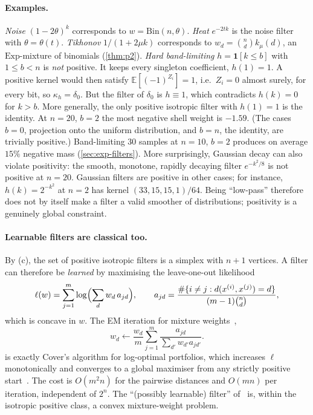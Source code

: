 \documentclass[11pt]{article}
\theoremstyle{definition}
\theoremstyle{remark}
\newcommand{\one}{\mathbf{1}}
\begin{document}
\paragraph{Examples.}
\emph{Noise} $(1-2\theta)^k$ corresponds to $w=\mathrm{Bin}(n,\theta)$. \emph{Heat} $e^{-2tk}$ is the noise filter with $\theta=\theta(t)$. \emph{Tikhonov} $1/(1+2\mu k)$ corresponds to $w_d=\binom nd k_\mu(d)$, an $\mathrm{Exp}$-mixture of binomials (\cref{thm:p2}). \emph{Hard band-limiting} $h=\one[k\le b]$ with $1\le b<n$ is \emph{not} positive. It keeps every singleton coefficient, $h(1)=1$. A positive kernel would then satisfy $\mathbb E[(-1)^{Z_i}]=1$, i.e.\ $Z_i=0$ almost surely, for every bit, so $\kappa_h=\delta_0$. But the filter of $\delta_0$ is $h\equiv1$, which contradicts $h(k)=0$ for $k>b$. More generally, the only positive isotropic filter with $h(1)=1$ is the identity. At $n=20$, $b=2$ the most negative shell weight is $-1.59$. (The cases $b=0$, projection onto the uniform distribution, and $b=n$, the identity, are trivially positive.) Band-limiting $30$ samples at $n=10$, $b=2$ produces on average $15\%$ negative mass (\cref{sec:exp-filters}). More surprisingly, Gaussian decay can also violate positivity: the smooth, monotone, rapidly decaying filter $e^{-k^2/8}$ is not positive at $n=20$. Gaussian filters are positive in other cases; for instance, $h(k)=2^{-k^2}$ at $n=2$ has kernel $(33,15,15,1)/64$. Being ``low-pass'' therefore does not by itself make a filter a valid smoother of distributions; positivity is a genuinely global constraint.

\paragraph{Learnable filters are classical too.}
By (c), the set of positive isotropic filters is a simplex with $n+1$ vertices. A filter can therefore be \emph{learned} by maximising the leave-one-out likelihood
\[
\ell(w)=\sum_{j=1}^m\log\Bigl(\sum_d w_d\,a_{jd}\Bigr),\qquad a_{jd}=\frac{\#\{i\neq j:d(x^{(i)},x^{(j)})=d\}}{(m-1)\binom nd},
\]
which is concave in $w$. The EM iteration for mixture weights~\cite{dempster1977em},
\[
w_d\leftarrow \frac{w_d}{m}\sum_{j=1}^m \frac{a_{jd}}{\sum_{d'}w_{d'}a_{jd'}} .
\]
is exactly Cover's algorithm for log-optimal portfolios, which increases $\ell$ monotonically and converges to a global maximiser from any strictly positive start~\cite{cover1984algorithm}. The cost is $O(m^2n)$ for the pairwise distances and $O(mn)$ per iteration, independent of $2^n$. The ``(possibly learnable) filter'' of~\cite{belis2026spectral} is, within the isotropic positive class, a convex mixture-weight problem.
\end{document}
